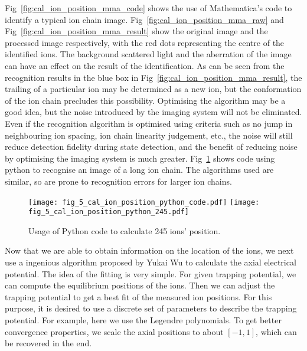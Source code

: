 Fig~\ref{fig:cal_ion_position_mma_code} shows the use of Mathematica's code to identify a typical ion chain image. Fig~\ref{fig:cal_ion_position_mma_raw} and Fig~\ref{fig:cal_ion_position_mma_result} show the original image and the processed image respectively, with the red dots representing the centre of the identified ions. The background scattered light and the aberration of the image can have an effect on the result of the identification. As can be seen from the recognition results in the blue box in Fig~\ref{fig:cal_ion_position_mma_result}, the trailing of a particular ion may be determined as a new ion, but the conformation of the ion chain precludes this possibility. Optimising the algorithm may be a good idea, but the noise introduced by the imaging system will not be eliminated. Even if the recognition algorithm is optimised using criteria such as no jump in neighbouring ion spacing, ion chain linearity judgement, etc., the noise will still reduce detection fidelity during state detection, and the benefit of reducing noise by optimising the imaging system is much greater. Fig~\ref{fig:cal_ion_position_python} shows code using python to recognise an image of a long ion chain. The algorithms used are similar, so are prone to recognition errors for larger ion chains.

\begin{figure}
    \centering
    {\texttt{[image: fig\_5\_cal\_ion\_position\_python\_code.pdf]}}
    {\texttt{[image: fig\_5\_cal\_ion\_position\_python\_245.pdf]}}
    \caption{Usage of Python code to calculate 245 ions' position.}
    \label{fig:cal_ion_position_python}
\end{figure}

Now that we are able to obtain information on the location of the ions, we next use a ingenious algorithm proposed by Yukai Wu to calculate the axial electrical potential. The idea of the fitting is very simple. For given trapping potential, we can compute the equilibrium positions of the ions. Then we can adjust the trapping potential to get a best fit of the measured ion positions. For this purpose, it is desired to use a discrete set of parameters to describe the trapping potential. For example, here we use the Legendre polynomials. To get better convergence properties, we scale the axial positions to about $[-1,1]$, which can be recovered in the end.

